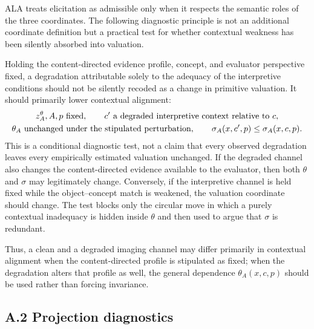 \documentclass[reqno,final]{amsart}
\theoremstyle{definition}
\theoremstyle{plain}
\theoremstyle{remark}
\begin{document}
ALA treats elicitation as admissible only when it respects the semantic roles of the three coordinates. The following diagnostic principle is not an additional coordinate definition but a practical test for whether contextual weakness has been silently absorbed into valuation.

Holding the content-directed evidence profile, concept, and evaluator perspective fixed, a degradation attributable solely to the adequacy of the interpretive conditions should not be silently recoded as a change in primitive valuation. It should primarily lower contextual alignment:
\begin{equation}
\label{eq:app-context-perturbation}
\begin{gathered}
 z_A^\theta,A,p \ \hbox{fixed},\qquad c' \ \hbox{a degraded interpretive context relative to } c,\\
 \theta_A \ \hbox{unchanged under the stipulated perturbation},\qquad
 \sigma_A(x,c',p) \leq \sigma_A(x,c,p).
\end{gathered}
\end{equation}
This is a conditional diagnostic test, not a claim that every observed degradation leaves every empirically estimated valuation unchanged. If the degraded channel also changes the content-directed evidence available to the evaluator, then both \(\theta\) and \(\sigma\) may legitimately change. Conversely, if the interpretive channel is held fixed while the object--concept match is weakened, the valuation coordinate should change. The test blocks only the circular move in which a purely contextual inadequacy is hidden inside \(\theta\) and then used to argue that \(\sigma\) is redundant.

Thus, a clean and a degraded imaging channel may differ primarily in contextual alignment when the content-directed profile is stipulated as fixed; when the degradation alters that profile as well, the general dependence \(\theta_A(x,c,p)\) should be used rather than forcing invariance.

\subsection*{A.2 Projection diagnostics}
\end{document}
